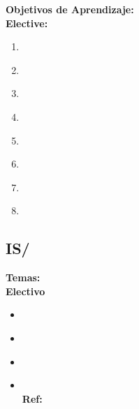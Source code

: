 \noindent \textbf{Objetivos de Aprendizaje:}\\
\noindent \textbf{Elective:}
\begin{enumerate}
	\setcounter{enumi}{0}
	\item \ISRoboticsLOListCapabilities\xspace[\ISRoboticsLOListCapabilitiesLevel]\label{sec:BOK:ISRoboticsLOListCapabilities}
	\item \ISRoboticsLOIntegrate\xspace[\ISRoboticsLOIntegrateLevel]\label{sec:BOK:ISRoboticsLOIntegrate}
	\item \ISRoboticsLOProgram\xspace[\ISRoboticsLOProgramLevel]\label{sec:BOK:ISRoboticsLOProgram}
	\item \ISRoboticsLOImplementFundamental\xspace[\ISRoboticsLOImplementFundamentalLevel]\label{sec:BOK:ISRoboticsLOImplementFundamental}
	\item \ISRoboticsLOCharacterizeTheWith\xspace[\ISRoboticsLOCharacterizeTheWithLevel]\label{sec:BOK:ISRoboticsLOCharacterizeTheWith}
	\item \ISRoboticsLOListTheRobots\xspace[\ISRoboticsLOListTheRobotsLevel]\label{sec:BOK:ISRoboticsLOListTheRobots}
	\item \ISRoboticsLOCompareAndLeast\xspace[\ISRoboticsLOCompareAndLeastLevel]\label{sec:BOK:ISRoboticsLOCompareAndLeast}
	\item \ISRoboticsLODescribeAt\xspace[\ISRoboticsLODescribeAtLevel]\label{sec:BOK:ISRoboticsLODescribeAt}
\end{enumerate}


\subsection{IS/\ISPerceptionandComputerVision}\label{sec:BOK:ISPerceptionandComputerVision}
\noindent \textbf{Temas:}\\
\noindent \textbf{Electivo}
\begin{itemize}
	\item \ISPerceptionandComputerVisionTopicComputer\label{sec:BOK:ISPerceptionandComputerVisionTopicComputer}
	\item \ISPerceptionandComputerVisionTopicAudio\label{sec:BOK:ISPerceptionandComputerVisionTopicAudio}
	\item \ISPerceptionandComputerVisionTopicModularity\label{sec:BOK:ISPerceptionandComputerVisionTopicModularity}
	\item \ISPerceptionandComputerVisionTopicApproaches\xspace \\ \textbf{Ref:} \label{sec:BOK:ISPerceptionandComputerVisionTopicApproaches}
\end{itemize}


